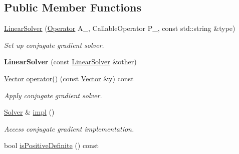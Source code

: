 \subsection*{\-Public \-Member \-Functions}
\begin{DoxyCompactItemize}
\item 
\hyperlink{classSpacy_1_1CG_1_1LinearSolver_a32f75ae5c449772649af6306b6f68497}{\-Linear\-Solver} (\hyperlink{classSpacy_1_1Operator}{\-Operator} \-A\-\_\-, \-Callable\-Operator \-P\-\_\-, const std\-::string \&type)
\begin{DoxyCompactList}\small\item\em \-Set up conjugate gradient solver. \end{DoxyCompactList}\item 
\hypertarget{classSpacy_1_1CG_1_1LinearSolver_a3c08d3c861d612d92168a350bc66c7dd}{{\bfseries \-Linear\-Solver} (const \hyperlink{classSpacy_1_1CG_1_1LinearSolver}{\-Linear\-Solver} \&other)}\label{classSpacy_1_1CG_1_1LinearSolver_a3c08d3c861d612d92168a350bc66c7dd}

\item 
\hypertarget{classSpacy_1_1CG_1_1LinearSolver_a5ee58f9858d840621a44658ceb721850}{\hyperlink{classSpacy_1_1Vector}{\-Vector} \hyperlink{classSpacy_1_1CG_1_1LinearSolver_a5ee58f9858d840621a44658ceb721850}{operator()} (const \hyperlink{classSpacy_1_1Vector}{\-Vector} \&y) const }\label{classSpacy_1_1CG_1_1LinearSolver_a5ee58f9858d840621a44658ceb721850}

\begin{DoxyCompactList}\small\item\em \-Apply conjugate gradient solver. \end{DoxyCompactList}\item 
\hypertarget{classSpacy_1_1CG_1_1LinearSolver_aa0aa5fdfdfd66e186fc86c35d7b49df6}{\hyperlink{classSpacy_1_1CG_1_1Solver}{\-Solver} \& \hyperlink{classSpacy_1_1CG_1_1LinearSolver_aa0aa5fdfdfd66e186fc86c35d7b49df6}{impl} ()}\label{classSpacy_1_1CG_1_1LinearSolver_aa0aa5fdfdfd66e186fc86c35d7b49df6}

\begin{DoxyCompactList}\small\item\em \-Access conjugate gradient implementation. \end{DoxyCompactList}\item 
\hypertarget{classSpacy_1_1CG_1_1LinearSolver_adec5404c595dc514a9c81c9ccc06cf41}{bool \hyperlink{classSpacy_1_1CG_1_1LinearSolver_adec5404c595dc514a9c81c9ccc06cf41}{is\-Positive\-Definite} () const }\label{classSpacy_1_1CG_1_1LinearSolver_adec5404c595dc514a9c81c9ccc06cf41}


\end{DoxyCompactItemize}
